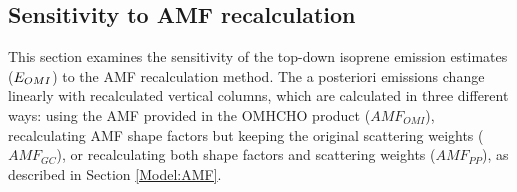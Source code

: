 
    

    \subsection{Sensitivity to AMF recalculation}
      \label{BioIsop:uncertainty:recalc}
      
      This section examines the sensitivity of the top-down isoprene emission estimates ($E_{OMI}$) to the AMF recalculation method.
      The a posteriori emissions change linearly with recalculated vertical columns, which are calculated in three different ways: using the AMF provided in the OMHCHO product ($AMF_{OMI}$), recalculating AMF shape factors but keeping the original scattering weights ($AMF_{GC}$), or recalculating both shape factors and scattering weights ($AMF_{PP}$), as described in Section \ref{Model:AMF}.
      
